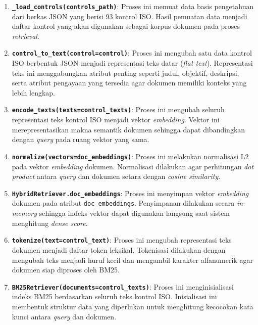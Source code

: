 \documentclass[12pt,a4paper]{article}
\begin{document}
\begin{enumerate}[label=\alph*., leftmargin=1.1cm]
\item \textbf{\texttt{\_load\_controls(controls\_path)}}: Proses ini memuat data basis pengetahuan dari berkas JSON yang berisi 93 kontrol ISO. Hasil pemuatan data menjadi daftar kontrol yang akan digunakan sebagai korpus dokumen pada proses \textit{retrieval}.

\item \textbf{\texttt{control\_to\_text(control=control)}}: Proses ini mengubah satu data kontrol ISO berbentuk JSON menjadi representasi teks datar (\textit{flat text}). Representasi teks ini menggabungkan atribut penting seperti judul, objektif, deskripsi, serta atribut pengayaan yang tersedia agar dokumen memiliki konteks yang lebih lengkap.

\item \textbf{\texttt{encode\_texts(texts=control\_texts)}}: Proses ini mengubah seluruh representasi teks kontrol ISO menjadi vektor \textit{embedding}. Vektor ini merepresentasikan makna semantik dokumen sehingga dapat dibandingkan dengan \textit{query} pada ruang vektor yang sama.

\item \textbf{\texttt{normalize(vectors=doc\_embeddings)}}: Proses ini melakukan normalisasi L2 pada vektor \textit{embedding} dokumen. Normalisasi dilakukan agar perhitungan \textit{dot product} antara \textit{query} dan dokumen setara dengan \textit{cosine similarity}.

\item \textbf{\texttt{HybridRetriever.doc\_embeddings}}: Proses ini menyimpan vektor \textit{embedding} dokumen pada atribut \texttt{doc\_embeddings}. Penyimpanan dilakukan secara \textit{in-memory} sehingga indeks vektor dapat digunakan langsung saat sistem menghitung \textit{dense score}.

\item \textbf{\texttt{tokenize(text=control\_text)}}: Proses ini mengubah representasi teks dokumen menjadi daftar token leksikal. Tokenisasi dilakukan dengan mengubah teks menjadi huruf kecil dan mengambil karakter alfanumerik agar dokumen siap diproses oleh BM25.

\item \textbf{\texttt{BM25Retriever(documents=control\_texts)}}: Proses ini menginisialisasi indeks BM25 berdasarkan seluruh teks kontrol ISO. Inisialisasi ini membentuk struktur data yang diperlukan untuk menghitung kecocokan kata kunci antara \textit{query} dan dokumen.


\end{enumerate}
\end{document}
